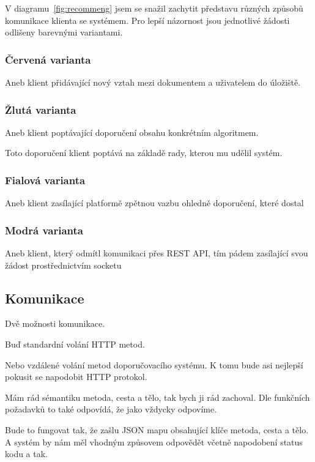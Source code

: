 \documentclass[thesis=M,czech]{FITthesis}[2014/05/07]
\begin{document}
V diagramu~\ref{fig:recommeng} jsem se snažil zachytit představu různých způsobů komunikace klienta se systémem. Pro lepší názornost jsou jednotlivé žádosti odlišeny barevnými variantami.

\subsubsection{Červená varianta}

Aneb klient přidávající nový vztah mezi dokumentem a uživatelem do úložiště.

\subsubsection{Žlutá varianta}

Aneb klient poptávající doporučení obsahu konkrétním algoritmem.

Toto doporučení klient poptává na základě rady, kterou mu udělil systém. 

\subsubsection{Fialová varianta}

Aneb klient zasílající platformě zpětnou vazbu ohledně doporučení, které dostal

\subsubsection{Modrá varianta}

Aneb klient, který odmítl komunikaci přes REST API, tím pádem zasílající svou žádost prostřednictvím socketu

\subsection{Komunikace}

Dvě možnosti komunikace.

Buď standardní volání HTTP metod.

Nebo vzdálené volání metod doporučovacího systému. K tomu bude asi nejlepší pokusit se napodobit HTTP protokol. 

Mám rád sémantiku metoda, cesta a tělo, tak bych ji rád zachoval. Dle funkčních požadavků to také odpovídá, že jako vždycky odpovíme. 

Bude to  fungovat tak, že zašlu JSON mapu obsahující klíče metoda, cesta a tělo. A systém by nám měl vhodným způsovem odpovědět včetně napodobení status  kodu a tak. 
\end{document}
